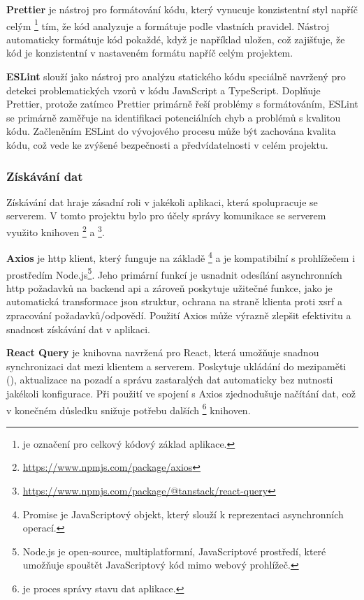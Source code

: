 \textbf{Prettier} je nástroj pro formátování kódu, který vynucuje konzistentní styl napříč celým \footnote{ je označení pro celkový kódový základ aplikace.} tím, že kód analyzuje a formátuje podle vlastních pravidel.
Nástroj automaticky formátuje kód pokaždé, když je například uložen, což zajišťuje, že kód je konzistentní v nastaveném formátu napříč celým projektem\cite{p__prettier_io}.

\textbf{ESLint} slouží jako nástroj pro analýzu statického kódu speciálně navržený pro detekci problematických vzorů v kódu JavaScript a TypeScript.
Doplňuje Prettier, protože zatímco Prettier primárně řeší problémy s formátováním, ESLint se primárně zaměřuje na identifikaci potenciálních chyb a problémů s kvalitou kódu.
Začleněním ESLint do vývojového procesu může být zachována kvalita kódu, což vede ke zvýšené bezpečnosti a předvídatelnosti v celém projektu\cite{e__eslint_org}.

\subsubsection{Získávání dat}
\label{subsubsec:implementace-technologie-ostatni-ziskavani}
Získávání dat hraje zásadní roli v jakékoli aplikaci, která spolupracuje se serverem.
V tomto projektu bylo pro účely správy komunikace se serverem využito knihoven \footnote{\url{https://www.npmjs.com/package/axios}} a \footnote{\url{https://www.npmjs.com/package/@tanstack/react-query}}.

\textbf{Axios} je \ac{http} klient, který funguje na základě \footnote{Promise je JavaScriptový objekt, který slouží k reprezentaci asynchronních operací.} a je kompatibilní s prohlížečem i prostředím Node.js\footnote{Node.js je open-source, multiplatformní, JavaScriptové prostředí, které umožňuje spouštět JavaScriptový kód mimo webový prohlížeč\cite{n__nodejs_org}.}.
Jeho primární funkcí je usnadnit odesílání asynchronních \ac{http} požadavků na backend \ac{api} a zároveň poskytuje užitečné funkce, jako je automatická transformace \ac{json} struktur, ochrana na straně klienta proti \ac{xsrf} a zpracování požadavků/odpovědí.
Použití Axios může výrazně zlepšit efektivitu a snadnost získávání dat v aplikaci.

\textbf{React Query} je knihovna navržená pro React, která umožňuje snadnou synchronizaci dat mezi klientem a serverem.
Poskytuje ukládání do mezipaměti (), aktualizace na pozadí a správu zastaralých dat automaticky bez nutnosti jakékoli konfigurace.
Při použití ve spojení s Axios zjednodušuje načítání dat, což v konečném důsledku snižuje potřebu dalších \footnote{ je proces správy stavu dat aplikace.} knihoven.

